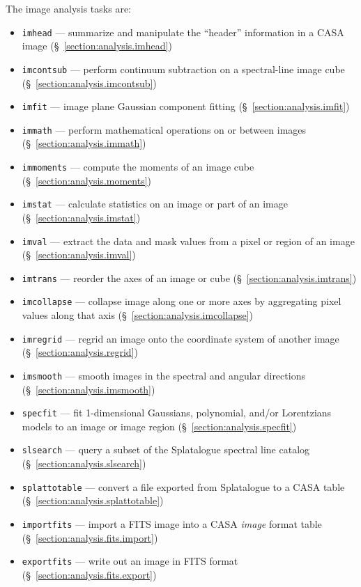 The image analysis tasks are:
\begin{itemize}
   \item {\tt imhead} --- summarize and manipulate the ``header'' 
         information in a CASA image 
         (\S~\ref{section:analysis.imhead})
   \item {\tt imcontsub} --- perform continuum subtraction on a
         spectral-line image cube 
         (\S~\ref{section:analysis.imcontsub})
   \item {\tt imfit} --- image plane Gaussian component fitting
         (\S~\ref{section:analysis.imfit})
   \item {\tt immath} --- perform mathematical operations on or
         between images
         (\S~\ref{section:analysis.immath})
   \item {\tt immoments} --- compute the moments of an image cube
         (\S~\ref{section:analysis.moments})
   \item {\tt imstat} --- calculate statistics on an image or part
         of an image
         (\S~\ref{section:analysis.imstat})
   \item {\tt imval} --- extract the data and mask values from a
         pixel or region of an image
         (\S~\ref{section:analysis.imval})
  \item {\tt imtrans} --- reorder the axes of an image or cube
         (\S~\ref{section:analysis.imtrans})
  \item {\tt imcollapse} --- collapse image along one or more axes by aggregating pixel values along that axis 
         (\S~\ref{section:analysis.imcollapse})
   \item {\tt imregrid} --- regrid an image onto the coordinate
         system of another image 
         (\S~\ref{section:analysis.regrid})
   \item {\tt imsmooth} --- smooth images in the spectral and angular directions
         (\S~\ref{section:analysis.imsmooth})
   \item{\tt specfit} --- fit 1-dimensional Gaussians, 
     polynomial, and/or Lorentzians models to an image or image region 
          (\S~\ref{section:analysis.specfit})
  \item{\tt slsearch} --- query a subset of the Splatalogue spectral
line catalog
          (\S~\ref{section:analysis.slsearch})
  \item{\tt splattotable} --- convert a file exported from Splatalogue
to a CASA table 
          (\S~\ref{section:analysis.splattotable})




   \item {\tt importfits} --- import a FITS image into a CASA  
         {\it image} format table 
         (\S~\ref{section:analysis.fits.import})
   \item {\tt exportfits} --- write out an image in FITS format
         (\S~\ref{section:analysis.fits.export})
\end{itemize}

